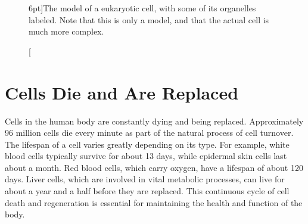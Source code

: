 \begin{figure}[h!]
    \caption[][6pt]{The model of a eukaryotic cell, with some of its organelles labeled. Note that this is only a model, and that the actual cell is much more complex.}
    \label{fig:cell}
\end{figure}

\section{Cells Die and Are Replaced}

Cells in the human body are constantly dying and being replaced.
Approximately 96 million cells die every minute as part of the natural process of cell turnover. The lifespan of a cell varies greatly depending on its type. For example, white blood cells typically survive for about 13 days, while epidermal skin cells last about a month. Red blood cells, which carry oxygen, have a lifespan of about 120 days. Liver cells, which are involved in vital metabolic processes, can live for about a year and a half before they are replaced. This continuous cycle of cell death and regeneration is essential for maintaining the health and function of the body.


